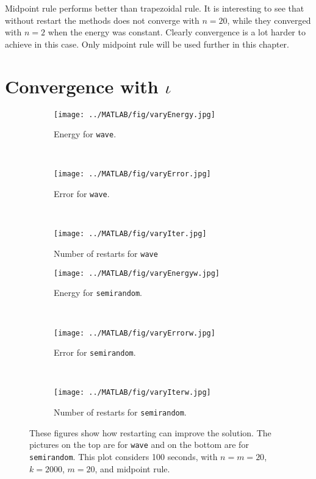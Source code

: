 Midpoint rule performs better than trapezoidal rule. It is interesting to see that without restart the methods does not converge with $n = 20$, while they converged with $n = 2$ when the energy was constant. Clearly convergence is a lot harder to achieve in this case. Only midpoint rule will be used further in this chapter.\\

\section{Convergence with $\iota$} %

\begin{figure}[H]
        \centering
        \begin{subfigure}[b]{0.3\textwidth}
                \texttt{[image: ../MATLAB/fig/varyEnergy.jpg]}
                \caption{ Energy for \texttt{wave}. }
                \label{fig:varyEnergy}
        \end{subfigure}%
        ~
		\begin{subfigure}[b]{0.3\textwidth}
                \texttt{[image: ../MATLAB/fig/varyError.jpg]}
                \caption{ Error for \texttt{wave}. }
                \label{fig:varyError}
        \end{subfigure}%
        ~
        \begin{subfigure}[b]{0.3\textwidth}
                \texttt{[image: ../MATLAB/fig/varyIter.jpg]}
                \caption{ Number of restarts for \texttt{wave} }
                \label{fig:varyIter}
        \end{subfigure}%
        
        \begin{subfigure}[b]{0.3\textwidth}
                \texttt{[image: ../MATLAB/fig/varyEnergyw.jpg]}
                \caption{ Energy for \texttt{semirandom}. }
                \label{fig:varyEnergyw}
        \end{subfigure}
		~
        \begin{subfigure}[b]{0.3\textwidth}
                \texttt{[image: ../MATLAB/fig/varyErrorw.jpg]}
                \caption{ Error for \texttt{semirandom}. }
                \label{fig:varyErrorw}
        \end{subfigure}
        ~
        \begin{subfigure}[b]{0.3\textwidth}
                \texttt{[image: ../MATLAB/fig/varyIterw.jpg]}
                \caption{ Number of restarts for \texttt{semirandom}. }
                \label{fig:varyIterw}
        \end{subfigure}
        \caption{ These figures show how restarting can improve the solution. The pictures on the top are for \texttt{wave} and on the bottom are for \texttt{semirandom}. This plot considers 100 seconds, with  $n=m=20$, $k = 2000$, $m = 20$, and midpoint rule. }
        \label{fig:variota}
\end{figure}
